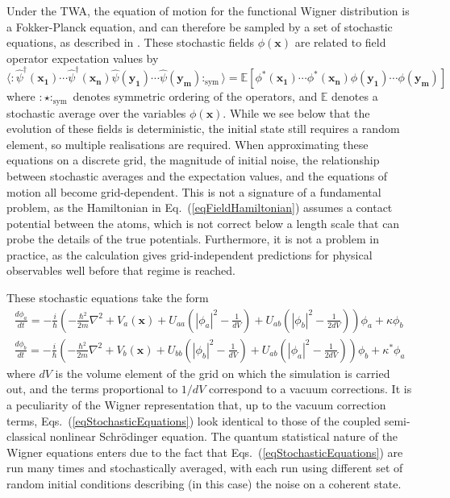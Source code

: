 \documentclass{iopart}
\begin{document}
Under the TWA, the equation of motion for the functional Wigner distribution is a Fokker-Planck equation, and can therefore be sampled by a set of stochastic equations, as described in \cite{GardinerQuantumNoise}.  These stochastic fields $\phi(\mathbf{x})$ are related to field operator expectation values by  
\begin{equation}
\langle :\hat{\psi}^\dagger(\mathbf{x_1})\cdots\hat{\psi}^\dagger(\mathbf{x_n})\hat{\psi}(\mathbf{y_1})\cdots\hat{\psi}(\mathbf{y_m}):_{\mbox{sym}}\rangle = \mathbb{E}\left[\phi^*(\mathbf{x_1})\cdots\phi^*(\mathbf{x_n})\phi(\mathbf{y_1})\cdots\phi(\mathbf{y_m})\right]
\label{eqExpectationRelations}
\end{equation}
%
where $:\star:_{\mbox{sym}}$ denotes symmetric ordering of the operators, and $\mathbb{E}$ denotes a stochastic average over the variables $\phi(\mathbf{x})$.  While we see below that the evolution of these fields is deterministic, the initial state still requires a random element, so multiple realisations are required.  When approximating these equations on a discrete grid, the magnitude of initial noise, the relationship between stochastic averages and the expectation values, and the equations of motion all become grid-dependent.  This is not a signature of a fundamental problem, as the Hamiltonian in Eq.~(\ref{eqFieldHamiltonian}) assumes a contact potential between the atoms, which is not correct below a length scale that can probe the details of the true potentials.  Furthermore, it is not a problem in practice, as the calculation gives grid-independent predictions for physical observables well before that regime is reached.

These stochastic equations take the form
\begin{eqnarray}
\frac{d \phi_a}{dt} = -\frac{i}{\hbar}\left(-\frac{\hbar^2}{2 m}\nabla^2+V_a(\mathbf{x}) + U_{a a} \left( \left|\phi_{a}\right|^2 -\frac{1}{dV}\right) + U_{a b} \left( \left|\phi_b\right|^2 -\frac{1}{2dV}\right)  \right)\phi_a   + \kappa \phi_b  \nonumber \\
\frac{d \phi_b}{dt} = -\frac{i}{\hbar}\left(-\frac{\hbar^2}{2 m}\nabla^2+V_b(\mathbf{x}) + U_{b b} \left( \left|\phi_{b}\right|^2 - \frac{1}{dV} \right) + U_{a b} \left( \left|\phi_a\right|^2 -\frac{1}{2dV} \right)   \right)\phi_b   + \kappa^* \phi_a
  \label{eqStochasticEquations}
\end{eqnarray}
where $dV$ is the volume element of the grid on which the simulation is carried out, and the terms proportional to $1/dV$ correspond to a vacuum corrections. It is a peculiarity of the Wigner representation that, up to the vacuum correction terms, Eqs.~(\ref{eqStochasticEquations}) look identical to those of the coupled semi-classical nonlinear Schr{\"{o}}dinger equation. The quantum statistical nature of the Wigner equations enters due to the fact that Eqs.~(\ref{eqStochasticEquations}) are run many times and stochastically averaged, with each run using different set of random initial conditions describing (in this case) the noise on a coherent state.
\end{document}
